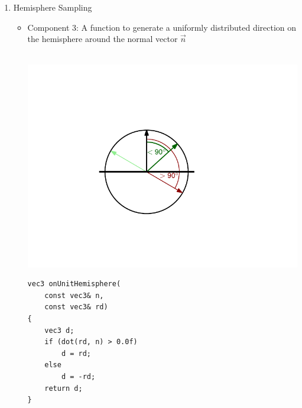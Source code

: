 \documentclass[utf8,stillsansserifmath,fleqn,t]{beamer}
\newcommand{\labelname}[1]{\def\insertenumlabel{#1}\usebeamertemplate{enumerate item}}
\begin{document}
\begin{frame}[fragile]
\frametitle{\insertsection}
\begin{enumerate}
\item[\labelname{5}] Hemisphere Sampling
\begin{itemize}
\item Component 3: A function to generate a uniformly distributed
direction on the hemisphere around the normal vector $\vec{n}$\\~\\
\begin{minipage}{.35\textwidth}
\includegraphics[width=\textwidth]{./fig/sampling-uniform-hemisphere.pdf}
\end{minipage}\hfill
\begin{minipage}{.5\textwidth}
\begin{lstlisting}
vec3 onUnitHemisphere(
    const vec3& n,
    const vec3& rd)
{
    vec3 d;
    if (dot(rd, n) > 0.0f)
        d = rd;
    else
        d = -rd;
    return d;
}
\end{lstlisting}
\end{minipage}
\end{itemize}
\end{enumerate}
\end{frame}
\end{document}

